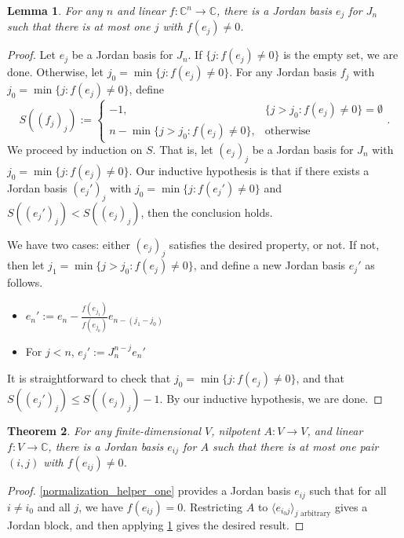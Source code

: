 \documentclass[12pt,psamsfonts]{article}
\newtheorem{theorem}{Theorem}[section]
\newtheorem{lemma}[theorem]{Lemma}
\begin{document}
\begin{lemma}\label{normalization_helper_two}
    For any \(n\) and linear \(f : \mathbb{C}^n \to \mathbb{C}\), there is a Jordan basis \(e_j\) for \(J_n\) such that there is at most one \(j\) with \(f(e_j) \neq 0\).
\end{lemma}
\begin{proof}
    Let \(e_j\) be a Jordan basis for \(J_n\).
    If \(\{j : f(e_j) \neq 0\}\) is the empty set, we are done.
    Otherwise, let \(j_0 = \min\{j : f(e_j) \neq 0\}\).
    For any Jordan basis \(f_j\) with \(j_0 = \min\{j : f(e_j) \neq 0\}\), define 
    \[S((f_j)_j) := \begin{cases}
        -1, & \{j > j_0 : f(e_j) \neq 0\} = \emptyset \\
        n - \min\{j > j_0 : f(e_j) \neq 0\}, & \textrm{otherwise}
    \end{cases}.\]
    We proceed by induction on \(S\).
    That is, let \((e_j)_j\) be a Jordan basis for \(J_n\) with \(j_0 = \min\{j : f(e_j) \neq 0\}\).
    Our inductive hypothesis is that if there exists a Jordan basis \((e_j')_j\) with \(j_0 = \min\{j : f(e_j') \neq 0\}\) and \(S((e_j')_j) < S((e_j)_j)\), then the conclusion holds.
    \par We have two cases: either \((e_j)_j\) satisfies the desired property, or not.
    If not, then let \(j_1 = \min\{j > j_0 : f(e_j) \neq 0\}\), and define a new Jordan basis \(e_j'\) as follows.
    \begin{itemize}
        \item \(e_n' := e_n - \frac{f(e_{j_1})}{f(e_{j_0})} e_{n - (j_1 - j_0)}\)
        \item For \(j < n\), \(e_j' := J_n^{n - j} e_n'\)
    \end{itemize}
    It is straightforward to check that \(j_0 = \min\{j : f(e_j) \neq 0\}\), and that \(S((e_j')_j) \leq S((e_j)_j) - 1\).
    By our inductive hypothesis, we are done.
\end{proof}

\begin{theorem}\label{normalization}
    For any finite-dimensional \(V\), nilpotent \(A : V \to V\), and linear \(f : V \to \mathbb{C}\), there is a Jordan basis \(e_{ij}\) for \(A\) such that there is at most one pair \((i, j)\) with \(f(e_{ij}) \neq 0\).
\end{theorem}
\begin{proof}
    \cref{normalization_helper_one} provides a Jordan basis \(e_{ij}\) such that for all \(i \neq i_0\) and all \(j\), we have \(f(e_{ij}) = 0\).
    Restricting \(A\) to \(\langle e_{i_0j}\rangle_{j \textrm{ arbitrary}}\) gives a Jordan block, and then applying \cref{normalization_helper_two} gives the desired result.
\end{proof}
\end{document}
